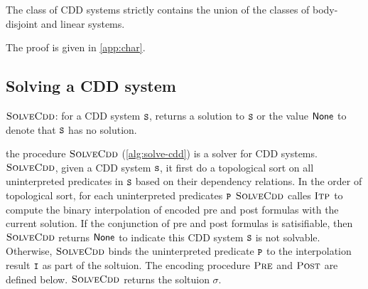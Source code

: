 \begin{thm}
	\label{thm:cdd-contains}
  The class of CDD systems strictly contains the union of the classes
  of body-disjoint and linear systems.
\end{thm}
%
The proof is given in \autoref{app:char}.

\subsection{Solving a CDD system}
\label{sec:solve-cdd}

\begin{algorithm}[t]
  \caption{$\textsc{SolveCdd}$: for a CDD system $\cc{S}$, returns a
    solution to $\cc{S}$ or the value $\mathsf{None}$ to denote that
    $\cc{S}$ has no solution.}
  \label{alg:solve-cdd}
\end{algorithm}


the procedure $\textsc{SolveCdd}$ (\autoref{alg:solve-cdd}) is a solver for CDD systems.
%
$\textsc{SolveCdd}$, given a CDD system $\cc{S}$, it first do a topological sort on all
uninterpreted predicates in $\cc{S}$ based on their dependency relations.
%
In the order of topological sort, for each uninterpreted predicates $\cc{P}$ 
 $\textsc{SolveCdd}$ calles $\textsc{Itp}$ to compute the binary interpolation of 
 encoded pre and post formulas with the current solution.
 If the conjunction of pre and post formulas is satisifiable, then $\textsc{SolveCdd}$
 returns $\mathsf{None}$ to indicate this CDD system $\cc{S}$ is not solvable.
 Otherwise, $\textsc{SolveCdd}$ binds the uninterpreted predicate $\cc{P}$ to the
 interpolation result $\cc{I}$ as part of the soltuion.
 The encoding procedure $\textsc{Pre}$ and $\textsc{Post}$ are defined below.
 $\textsc{SolveCdd}$ returns the soltuion $\sigma$. 

